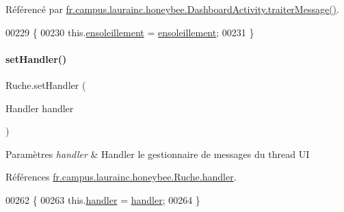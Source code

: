 Référencé par \hyperlink{classfr_1_1campus_1_1laurainc_1_1honeybee_1_1_dashboard_activity_a50d4c14e993ff1779ae5dce8cee11216}{fr.\+campus.\+laurainc.\+honeybee.\+Dashboard\+Activity.\+traiter\+Message()}.


\begin{DoxyCode}
00229                                                          \{
00230         this.\hyperlink{classfr_1_1campus_1_1laurainc_1_1honeybee_1_1_ruche_aebfc51ed0e12be0dddc7675884a8129b}{ensoleillement} = \hyperlink{classfr_1_1campus_1_1laurainc_1_1honeybee_1_1_ruche_aebfc51ed0e12be0dddc7675884a8129b}{ensoleillement};
00231     \}
\end{DoxyCode}
\mbox{\label{classfr_1_1campus_1_1laurainc_1_1honeybee_1_1_ruche_acac6e35c9bc030a5cf608b245703d32e}} 
\paragraph{\texorpdfstring{set\+Handler()}{setHandler()}}
{\footnotesize\ttfamily Ruche.\+set\+Handler (\begin{DoxyParamCaption}\item[{Handler}]{handler }\end{DoxyParamCaption})}


\begin{DoxyParams}{Paramètres}
{\em handler} & Handler le gestionnaire de messages du thread UI \\
\hline
\end{DoxyParams}


Références \hyperlink{classfr_1_1campus_1_1laurainc_1_1honeybee_1_1_ruche_a9689ca454694434549e5fffca876ffae}{fr.\+campus.\+laurainc.\+honeybee.\+Ruche.\+handler}.


\begin{DoxyCode}
00262                                             \{
00263         this.\hyperlink{classfr_1_1campus_1_1laurainc_1_1honeybee_1_1_ruche_a9689ca454694434549e5fffca876ffae}{handler} = \hyperlink{classfr_1_1campus_1_1laurainc_1_1honeybee_1_1_ruche_a9689ca454694434549e5fffca876ffae}{handler};
00264     \}
\end{DoxyCode}
\mbox{\label{classfr_1_1campus_1_1laurainc_1_1honeybee_1_1_ruche_ae6a0d7783c6d429a28f1513201928909}} 
